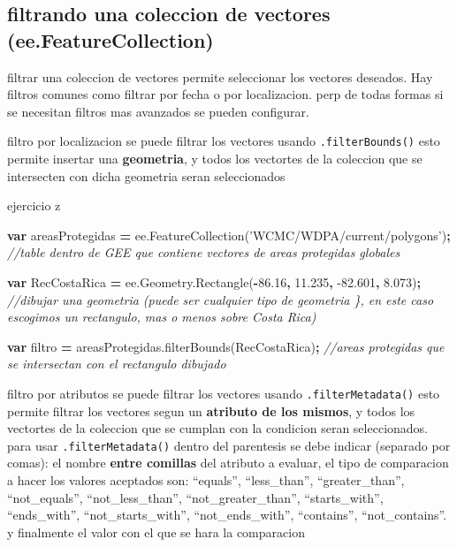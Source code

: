 \documentclass[
]{article}
\newenvironment{Shaded}{\begin{snugshade}}{\end{snugshade}}
\newcommand{\AttributeTok}[1]{\textcolor[rgb]{0.77,0.63,0.00}{#1}}
\newcommand{\CommentTok}[1]{\textcolor[rgb]{0.56,0.35,0.01}{\textit{#1}}}
\newcommand{\FloatTok}[1]{\textcolor[rgb]{0.00,0.00,0.81}{#1}}
\newcommand{\KeywordTok}[1]{\textcolor[rgb]{0.13,0.29,0.53}{\textbf{#1}}}
\newcommand{\NormalTok}[1]{#1}
\newcommand{\OperatorTok}[1]{\textcolor[rgb]{0.81,0.36,0.00}{\textbf{#1}}}
\newcommand{\StringTok}[1]{\textcolor[rgb]{0.31,0.60,0.02}{#1}}
\newcommand{\VariableTok}[1]{\textcolor[rgb]{0.00,0.00,0.00}{#1}}
\begin{document}
\hypertarget{filtrando-una-coleccion-de-vectores-ee.featurecollection}{%
\subsection{filtrando una coleccion de vectores
(ee.FeatureCollection)}\label{filtrando-una-coleccion-de-vectores-ee.featurecollection}}

filtrar una coleccion de vectores permite seleccionar los vectores
deseados. Hay filtros comunes como filtrar por fecha o por localizacion.
perp de todas formas si se necesitan filtros mas avanzados se pueden
configurar.

filtro por localizacion se puede filtrar los vectores usando
\texttt{.filterBounds()} esto permite insertar una \textbf{geometria}, y
todos los vectortes de la coleccion que se intersecten con dicha
geometria seran seleccionados

ejercicio z

\begin{Shaded}
\begin{Highlighting}[]
\KeywordTok{var}\NormalTok{ areasProtegidas }\OperatorTok{=} \VariableTok{ee}\NormalTok{.}\AttributeTok{FeatureCollection}\NormalTok{(}\StringTok{'WCMC/WDPA/current/polygons'}\NormalTok{)}\OperatorTok{;} \CommentTok{//table dentro de GEE que contiene vectores de areas protegidas globales}

\KeywordTok{var}\NormalTok{ RecCostaRica }\OperatorTok{=} \VariableTok{ee}\NormalTok{.}\VariableTok{Geometry}\NormalTok{.}\AttributeTok{Rectangle}\NormalTok{(}\OperatorTok{-}\FloatTok{86.16}\OperatorTok{,} \FloatTok{11.235}\OperatorTok{,} \FloatTok{-82.601}\OperatorTok{,} \FloatTok{8.073}\NormalTok{)}\OperatorTok{;} \CommentTok{//dibujar una geometria (puede ser cualquier tipo de geometria \}, en este caso escogimos un rectangulo, mas o menos sobre Costa Rica)}

\KeywordTok{var}\NormalTok{ filtro }\OperatorTok{=} \VariableTok{areasProtegidas}\NormalTok{.}\AttributeTok{filterBounds}\NormalTok{(RecCostaRica)}\OperatorTok{;} \CommentTok{//areas protegidas que se intersectan con el rectangulo dibujado}
\end{Highlighting}
\end{Shaded}

filtro por atributos se puede filtrar los vectores usando
\texttt{.filterMetadata()} esto permite filtrar los vectores segun un
\textbf{atributo de los mismos}, y todos los vectortes de la coleccion
que se cumplan con la condicion seran seleccionados. para usar
\texttt{.filterMetadata()} dentro del parentesis se debe indicar
(separado por comas): el nombre \textbf{entre comillas} del atributo a
evaluar, el tipo de comparacion a hacer los valores aceptados son:
``equals'', ``less\_than'', ``greater\_than'', ``not\_equals'',
``not\_less\_than'', ``not\_greater\_than'', ``starts\_with'',
``ends\_with'', ``not\_starts\_with'', ``not\_ends\_with'',
``contains'', ``not\_contains''. y finalmente el valor con el que se
hara la comparacion
\end{document}
